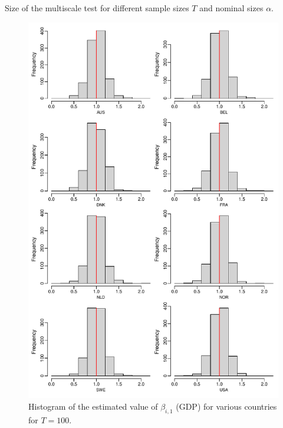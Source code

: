 \documentclass[a4paper,12pt]{article}
\begin{document}
\begin{enumerate}[label=\arabic*.,leftmargin=0.6cm]
{\begin{itemize}[topsep=0pt]
\begin{table}
\centering

\caption{Size of the multiscale test for different sample sizes $T$ and nominal sizes $\alpha$.}\label{table:size}
\end{table}

\begin{figure}[p!]
\begin{minipage}[t]{0.48\textwidth}
\includegraphics[width=\textwidth]{output/beta_GDP_T_100}
\caption{Histogram of the estimated value of $\beta_{i, 1}$ (GDP) for various countries for $T = 100$.}\label{fig:para:gdp:100}
\end{minipage}
\hspace{0.1cm}
\begin{minipage}[t]{0.48\textwidth}

\end{minipage}
\end{figure}
\end{itemize}}
\end{enumerate}
\end{document}
